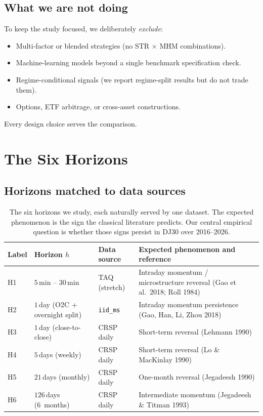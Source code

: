 \documentclass[11pt,letterpaper]{article}
\begin{document}
\subsection{What we are not doing}

To keep the study focused, we deliberately \emph{exclude}:
\begin{itemize}[leftmargin=*]
  \item Multi-factor or blended strategies (no STR $\times$ MHM combinations).
  \item Machine-learning models beyond a single benchmark specification check.
  \item Regime-conditional signals (we report regime-split results but do not trade them).
  \item Options, ETF arbitrage, or cross-asset constructions.
\end{itemize}
Every design choice serves the comparison.

\section{The Six Horizons}\label{sec:horizons}

\subsection{Horizons matched to data sources}

\begin{table}[H]
\centering
\small
\renewcommand{\arraystretch}{1.3}
\begin{tabularx}{\linewidth}{@{}l l l X@{}}
\toprule
\textbf{Label} & \textbf{Horizon $h$} & \textbf{Data source} & \textbf{Expected phenomenon and reference}\\
\midrule
H1 & $5$\,min -- $30$\,min  & TAQ (stretch)       & Intraday momentum / microstructure reversal (Gao et al.\ 2018; Roll 1984)\\
H2 & $1$\,day (O2C + overnight split) & \texttt{iid\_ms}    & Intraday momentum persistence (Gao, Han, Li, Zhou 2018)\\
H3 & $1$\,day (close-to-close) & CRSP daily       & Short-term reversal (Lehmann 1990)\\
H4 & $5$\,days (weekly)     & CRSP daily          & Short-term reversal (Lo \& MacKinlay 1990)\\
H5 & $21$\,days (monthly)   & CRSP daily          & One-month reversal (Jegadeesh 1990)\\
H6 & $126$\,days (6~months) & CRSP daily          & Intermediate momentum (Jegadeesh \& Titman 1993)\\
\bottomrule
\end{tabularx}
\caption{The six horizons we study, each naturally served by one dataset. The expected phenomenon is the sign the classical literature predicts. Our central empirical question is whether those signs persist in DJ30 over 2016--2026.}
\label{tab:horizons}
\end{table}
\end{document}
